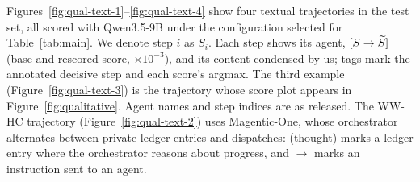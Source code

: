 



Figures~\ref{fig:qual-text-1}--\ref{fig:qual-text-4} show four textual trajectories
in the test set, all scored with Qwen3.5-9B under the configuration selected
for Table~\ref{tab:main}. We denote step $i$ as $S_i$. Each step shows its agent, $[S \rightarrow \widetilde{S}]$ (base and rescored score, $\times 10^{-3}$), and its content condensed by us; tags mark the annotated decisive step and each score's argmax. The third example (Figure~\ref{fig:qual-text-3}) is the trajectory whose score plot appears in Figure~\ref{fig:qualitative}. Agent names and step indices are as released. The \textsc{WW-HC} trajectory (Figure~\ref{fig:qual-text-2}) uses Magentic-One, whose orchestrator alternates between private ledger entries and dispatches: \textsf{(thought)} marks a ledger entry where the orchestrator reasons about progress, and $\rightarrow$ marks an instruction sent to an agent.

